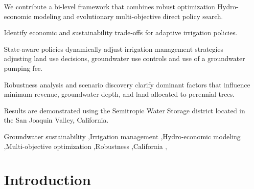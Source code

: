 \documentclass[a4paper,fleqn]{cas-sc}
\begin{document}
\begin{highlights}
\item We contribute a bi-level framework that combines robust optimization Hydro-economic modeling and evolutionary multi-objective direct policy search.
\item Identify economic and sustainability trade-offs for adaptive irrigation policies.
\item State-aware policies dynamically adjust irrigation management strategies adjusting land use decisions, groundwater use controls and use of a groundwater pumping fee.
\item Robustness analysis and scenario discovery clarify dominant factors that influence minimum revenue, groundwater depth, and land allocated to perennial trees.
\item Results are demonstrated using the Semitropic Water Storage district located in the San Joaquin Valley, California.
\end{highlights}

\begin{keywords}
Groundwater sustainability \sep Irrigation management \sep Hydro-economic modeling \sep Multi-objective optimization \sep Robustness \sep California \sep 
\end{keywords}


\maketitle

\section{Introduction}\label{sct:1}
\end{document}
